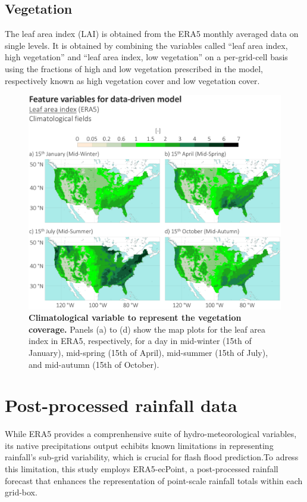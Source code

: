 \subsection{Vegetation}

The leaf area index (LAI) is obtained from the ERA5 monthly averaged data on single levels. It is obtained by combining the variables called “leaf area index, high vegetation” and “leaf area index, low vegetation” on a per-grid-cell basis using the fractions of high and low vegetation prescribed in the model, respectively known as high vegetation cover and low vegetation cover.

\begin{figure}[htbp]
\centering
\includegraphics[width=\textwidth]{lai.png}
\caption{\textbf{Climatological variable to represent the vegetation coverage.} Panels (a) to (d) show the map plots for the leaf area index in ERA5, respectively, for a day in mid-winter (15th of January), mid-spring (15th of April), mid-summer (15th of July), and mid-autumn (15th of October).}
\label{fig:lai}
\end{figure}



\section{Post-processed rainfall data}
\label{ecpoint_rainfall}

While ERA5 provides a comprenhensive suite of hydro-meteorological variables, its native precipitations output echibits known limitations in representing rainfall's sub-grid variability, which is crucial for flash flood prediction.To adress this limitation, this study employs ERA5-ecPoint, a post-processed rainfall forecast that enhances the representation of point-scale rainfall totals within each grid-box.  

